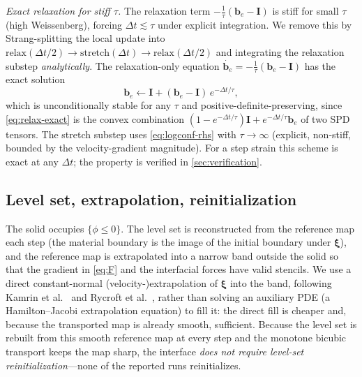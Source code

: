 \documentclass[final,3p,times]{elsarticle}
\theoremstyle{remark}
\newcommand{\xiv}{\bm{\xi}}              %
\newcommand{\be}{\bm{b}_e}              %
\newcommand{\It}{\bm{I}}                %
\newcommand{\dt}{\Delta t}
\begin{document}
\emph{Exact relaxation for stiff $\tau$.}
\label{sec:exact-relax}
The relaxation term $-\tfrac1\tau(\be-\It)$ is stiff for small $\tau$ (high
Weissenberg), forcing $\dt\lesssim\tau$ under explicit integration. We remove this by
Strang-splitting the local update into
$\text{relax}(\dt/2)\!\to\!\text{stretch}(\dt)\!\to\!\text{relax}(\dt/2)$ and
integrating the relaxation substep \emph{analytically}. The relaxation-only equation
$\dot{\be}=-\tfrac1\tau(\be-\It)$ has the exact solution
\begin{equation}
\be \leftarrow \It + (\be-\It)\,e^{-\dt/\tau},
\label{eq:relax-exact}
\end{equation}
which is unconditionally stable for any $\tau$ and positive-definite-preserving, since
\cref{eq:relax-exact} is the convex combination $(1-e^{-\dt/\tau})\It+e^{-\dt/\tau}\be$
of two SPD tensors. The stretch substep uses \cref{eq:logconf-rhs} with $\tau\to\infty$
(explicit, non-stiff, bounded by the velocity-gradient magnitude). For a step strain
this scheme is exact at any $\dt$; the property is verified in \cref{sec:verification}.
\subsection{Level set, extrapolation, reinitialization}
The solid occupies $\{\phi\le0\}$. The level set is reconstructed from the reference map
each step (the material boundary is the image of the initial boundary under $\xiv$), and
the reference map is extrapolated into a narrow band outside the solid so that the gradient in
\cref{eq:F} and the interfacial forces have valid stencils. We use a direct constant-normal
(velocity-)extrapolation of $\xiv$ into the band, following Kamrin et al.\
\cite{Kamrin2012} and Rycroft et al.\ \cite{Rycroft2020}, rather than solving an
auxiliary PDE (a Hamilton--Jacobi extrapolation equation) to fill it: the direct fill is cheaper
and, because the transported map is already smooth, sufficient. Because the level set is rebuilt
from this smooth reference map at every step and the monotone bicubic transport keeps the map
sharp, the interface \emph{does not require level-set reinitialization}---none of the reported
runs reinitializes.
\end{document}
